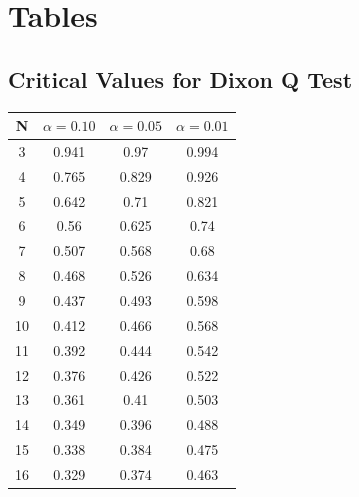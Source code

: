 \documentclass[a4paper,12pt]{article}
\begin{document}

%


\section*{Tables}
\subsection*{Critical Values for Dixon Q Test}
{
	\Large
	\begin{center}
		\begin{tabular}{|c|c|c|c|}
			\hline  N  & $\alpha=0.10$  & $\alpha=0.05$  & $\alpha=0.01$  \\ \hline
			3  & 0.941 & 0.97  & 0.994 \\ \hline
			4  & 0.765 & 0.829 & 0.926 \\ \hline
			5  & 0.642 & 0.71  & 0.821 \\ \hline
			6  & 0.56  & 0.625 & 0.74  \\ \hline
			7  & 0.507 & 0.568 & 0.68  \\ \hline
			8  & 0.468 & 0.526 & 0.634 \\ \hline
			9  & 0.437 & 0.493 & 0.598 \\ \hline
			10 & 0.412 & 0.466 & 0.568 \\ \hline
			11 & 0.392 & 0.444 & 0.542 \\ \hline
			12 & 0.376 & 0.426 & 0.522 \\ \hline
			13 & 0.361 & 0.41  & 0.503 \\ \hline
			14 & 0.349 & 0.396 & 0.488 \\ \hline
			15 & 0.338 & 0.384 & 0.475 \\ \hline
			16 & 0.329 & 0.374 & 0.463 \\ \hline
		\end{tabular} 
	\end{center}
}
\end{document}

